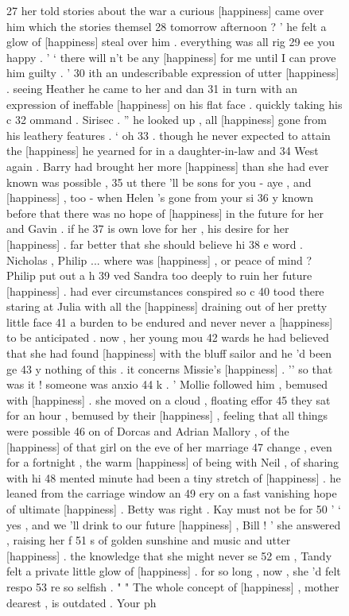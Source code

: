 \begin{figure}[!htbp]
\begin{fitverb}
27 her told stories about the war a curious [happiness] came over him which the stories themsel
28 tomorrow afternoon ? ' he felt a glow of [happiness] steal over him . everything was all rig
29 ee you happy . ' ` there will n't be any [happiness] for me until I can prove him guilty . '
30 ith an undescribable expression of utter [happiness] . seeing Heather he came to her and dan
31  in turn with an expression of ineffable [happiness] on his flat face . quickly taking his c
32 ommand . Sirisec . '' he looked up , all [happiness] gone from his leathery features . ` oh 
33 . though he never expected to attain the [happiness] he yearned for in a daughter-in-law and
34  West again . Barry had brought her more [happiness] than she had ever known was possible , 
35 ut there 'll be sons for you - aye , and [happiness] , too - when Helen 's gone from your si
36 y known before that there was no hope of [happiness] in the future for her and Gavin . if he
37 is own love for her , his desire for her [happiness] . far better that she should believe hi
38 e word . Nicholas , Philip ... where was [happiness] , or peace of mind ? Philip put out a h
39 ved Sandra too deeply to ruin her future [happiness] . had ever circumstances conspired so c
40 tood there staring at Julia with all the [happiness] draining out of her pretty little face 
41 a burden to be endured and never never a [happiness] to be anticipated . now , her young mou
42 wards he had believed that she had found [happiness] with the bluff sailor and he 'd been ge
43 y nothing of this . it concerns Missie's [happiness] . '' so that was it ! someone was anxio
44 k . ' Mollie followed him , bemused with [happiness] . she moved on a cloud , floating effor
45  they sat for an hour , bemused by their [happiness] , feeling that all things were possible
46 on of Dorcas and Adrian Mallory , of the [happiness] of that girl on the eve of her marriage
47 change , even for a fortnight , the warm [happiness] of being with Neil , of sharing with hi
48 mented minute had been a tiny stretch of [happiness] . he leaned from the carriage window an
49 ery on a fast vanishing hope of ultimate [happiness] . Betty was right . Kay must not be for
50 ' ` yes , and we 'll drink to our future [happiness] , Bill ! ' she answered , raising her f
51 s of golden sunshine and music and utter [happiness] . the knowledge that she might never se
52 em , Tandy felt a private little glow of [happiness] . for so long , now , she 'd felt respo
53 re so selfish . " " The whole concept of [happiness] , mother dearest , is outdated . Your ph
\end{fitverb}
\end{figure}

